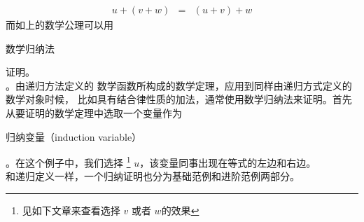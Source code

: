 \documentclass[twocolumn]{article}
\begin{document}
\begin{CJK}{UTF8}{gbsn}
\begin{eqnarray}
 u+(v+w) & = & (u+v)+w \label{assoc}
\end{eqnarray}
而如上的数学公理可以用\begin{CJK}{UTF8}{gkai}数学归纳法\end{CJK}证明。\\

\indent {}。由递归方法定义的 数学函数所构成的数学定理，应用到同样由递归方式定义的数学对象时候， 比如具有结合律性质的加法，通常使用数学归纳法来证明。首先从要证明的数学定理中选取一个变量作为\begin{CJK}{UTF8}{gkai}归纳变量（induction variable）\end{CJK}。在这个例子中，我们选择 \footnote{见如下文章来查看选择 $v$ 或者 $w$的效果} $u$，该变量同事出现在等式的左边和右边。\\

\indent \indent 和递归定义一样，一个归纳证明也分为基础范例和进阶范例两部分。



\end{CJK}
\end{document}
